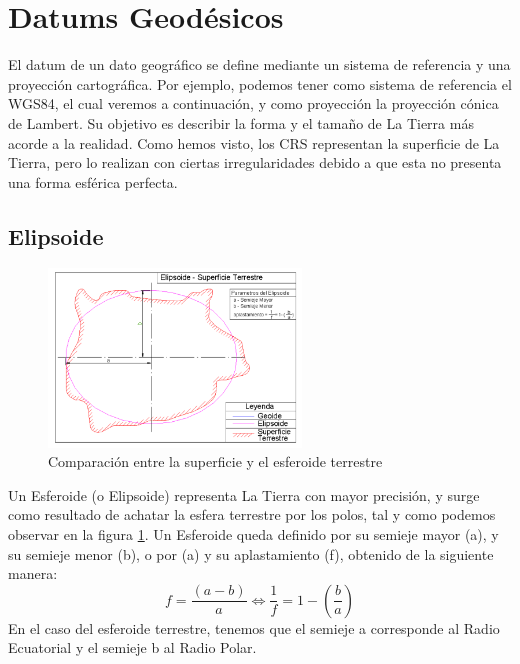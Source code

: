 \section{Datums Geodésicos}

El datum de un dato geográfico se define mediante un sistema de referencia y una proyección cartográfica.
Por ejemplo, podemos tener como sistema de referencia el WGS84, el cual veremos a continuación, y como proyección la proyección cónica de Lambert.
Su objetivo es describir la forma y el tamaño de La Tierra más acorde a la realidad.
Como hemos visto, los CRS representan la superficie de La Tierra, pero lo realizan con ciertas irregularidades debido a que esta no presenta una forma esférica perfecta.

\subsection{Elipsoide}

\begin{figure}[H]
  \centering
  \includegraphics[width=0.60\textwidth]{Imagenes/CRS/esferoide.png}
  \caption{Comparación entre la superficie y el esferoide terrestre} \label{fig:esferoide}
\end{figure}

Un Esferoide (o Elipsoide) representa La Tierra con mayor precisión, y surge como resultado de achatar la esfera terrestre por los polos, tal y como podemos observar en la figura \ref{fig:esferoide}.
Un Esferoide queda definido por su semieje mayor (a), y su semieje menor (b), o por (a) y su aplastamiento (f), obtenido de la siguiente manera:
\begin{equation}
  f = \frac{(a-b)}{a} \Leftrightarrow \frac{1}{f} = 1 - (\frac{b}{a})
\end{equation}
En el caso del esferoide terrestre, tenemos que el semieje a corresponde al Radio Ecuatorial y el semieje b al Radio Polar.

